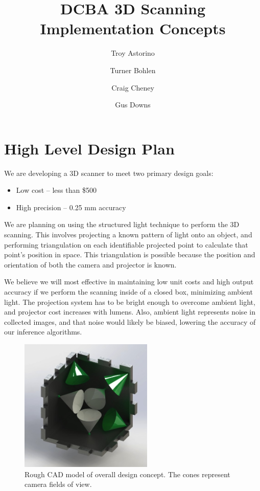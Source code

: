 \documentclass[10pt]{article}
\title{\vspace{-4em}DCBA 3D Scanning Implementation Concepts}
\author{Troy Astorino \and Turner Bohlen \and Craig Cheney \and Gus Downs}
\begin{document}
\maketitle
\vspace{-4em}
\section{High Level Design Plan}

We are developing a 3D scanner to meet two primary design goals:
\begin{itemize}
\item Low cost -- less than \$500
\item High precision -- 0.25 mm accuracy
\end{itemize}

We are planning on using the structured light technique to perform the 3D
scanning. This involves projecting a known pattern of light onto an object, and
performing triangulation on each identifiable projected point to calculate that
point's position in space. This triangulation is possible because the position
and orientation of both the camera and projector is known.

We believe we will most effective in maintaining low unit costs and high output
accuracy if we perform the scanning inside of a closed box, minimizing ambient
light. The projection system has to be bright enough to overcome ambient light,
and projector cost increases with lumens. Also, ambient light represents noise
in collected images, and that noise would likely be biased, lowering the
accuracy of our inference algorithms.

\begin{figure}[h]
\centering
\includegraphics[width=2.5in]{render01.JPG}
\caption{Rough CAD model of overall design concept. The cones represent camera
  fields of view.}
\end{figure}
\end{document}

